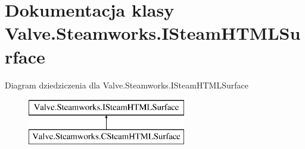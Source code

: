 \hypertarget{class_valve_1_1_steamworks_1_1_i_steam_h_t_m_l_surface}{}\section{Dokumentacja klasy Valve.\+Steamworks.\+I\+Steam\+H\+T\+M\+L\+Surface}
\label{class_valve_1_1_steamworks_1_1_i_steam_h_t_m_l_surface}
Diagram dziedziczenia dla Valve.\+Steamworks.\+I\+Steam\+H\+T\+M\+L\+Surface\begin{figure}[H]
\begin{center}
\leavevmode
\includegraphics[height=2.000000cm]{class_valve_1_1_steamworks_1_1_i_steam_h_t_m_l_surface}
\end{center}
\end{figure}
